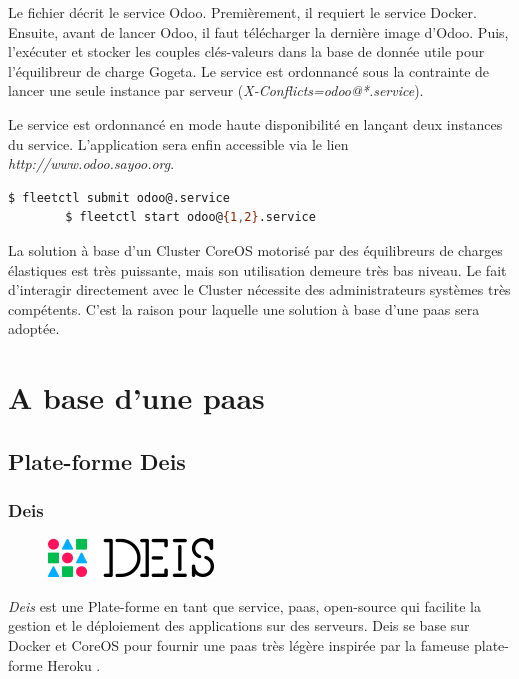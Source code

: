 \begin{onehalfspace}
Le fichier décrit le service Odoo. Premièrement, il requiert le service Docker. Ensuite, avant de lancer Odoo, il faut télécharger la dernière image d'Odoo. Puis, l'exécuter et stocker les couples clés-valeurs dans la base de donnée utile pour l'équilibreur de charge Gogeta. Le service est ordonnancé sous la contrainte de lancer une seule instance par serveur (\emph{X-Conflicts=odoo@*.service}).

Le service est ordonnancé en mode haute disponibilité en lançant deux instances du service. L'application sera enfin accessible via le lien \emph{http://www.odoo.sayoo.org}.

	\begin{lstlisting}[language=bash,caption=Ordonnancement de deux instances]
		$ fleetctl submit odoo@.service
		$ fleetctl start odoo@{1,2}.service
	\end{lstlisting}

La solution à base d'un Cluster CoreOS motorisé par des équilibreurs de charges élastiques est très puissante, mais son utilisation demeure très bas niveau. Le fait d'interagir directement avec le Cluster nécessite des administrateurs systèmes très compétents. C'est la raison pour laquelle une solution à base d'une \acrshort{paas} sera adoptée.


\section{A base d'une \acrshort{paas}}
\subsection{Plate-forme Deis}

\subsubsection*{Deis}

\begin{figure}
\centering
\includegraphics[scale=0.4]{chapitre5/assets/deis}
\end{figure}
\noindent \emph{Deis} est une Plate-forme en tant que service, \acrshort{paas}, open-source qui facilite la gestion et le déploiement des applications sur des serveurs. Deis se base sur Docker et CoreOS pour fournir une \acrshort{paas} très légère inspirée par la fameuse plate-forme Heroku \cite{deis}.



\end{onehalfspace}
